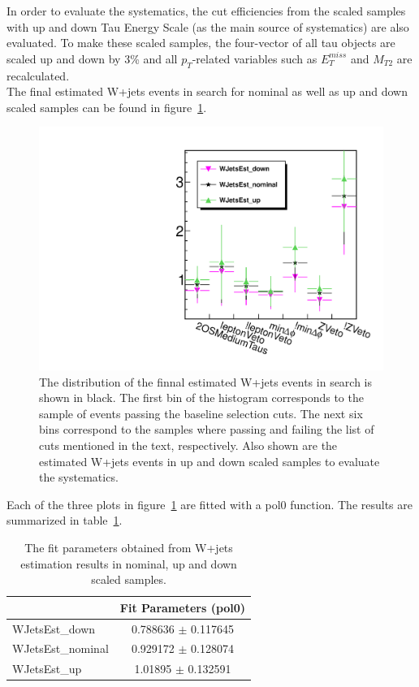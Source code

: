 In order to evaluate the systematics, the cut efficiencies from the scaled samples with 
up and down Tau Energy Scale (as the main source of systematics) are also evaluated.
To make these scaled samples, the four-vector of all tau objects 
are scaled up and down by 3\% and all $p_T$-related variables such as $E_T^{miss}$ 
and $M_{T2}$ are recalculated.\\
The final estimated W+jets events in search \binone for nominal as well as up and down scaled samples 
can be found in figure~\ref{fig:wjets_1}.  
\begin{figure}[iHhtb]
\centering
\includegraphics[angle=0,scale=0.35]{TauTauFigs/WJets_bin1.pdf}
\caption{The distribution of the finnal estimated W+jets events in search \binone is shown in black. 
 The first bin of the histogram corresponds to the sample of events passing the baseline selection cuts. 
The next six bins correspond to the samples where passing and failing the 
list of cuts mentioned in the text, respectively. Also shown are the estimated W+jets events in up and down scaled samples to evaluate the systematics.}
\label{fig:wjets_1}
\end{figure}

Each of the three plots in figure~\ref{fig:wjets_1} are fitted with a pol0 function. The results are summarized in table~\ref{tbl:fitpars}.
\begin{table}
\begin{center}
\begin{tabular}{lc}
\hline\hline
  & Fit Parameters (pol0) \\
\hline\hline
WJetsEst\_down & 0.788636 $\pm$ 0.117645 \\
WJetsEst\_nominal & 0.929172 $\pm$ 0.128074 \\
WJetsEst\_up & 1.01895 $\pm$ 0.132591 \\
\hline\hline
\end{tabular}
\caption{The fit parameters obtained from W+jets estimation results in nominal, up and down scaled samples.}
\label{tbl:fitpars}
\end{center}
\end{table}

